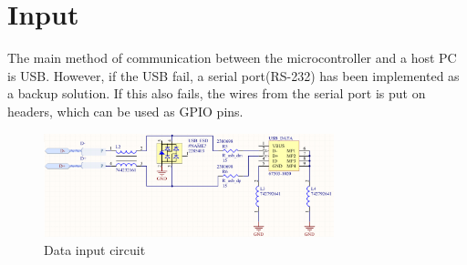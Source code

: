 \documentclass[../main/report.tex]{subfiles}
\begin{document}
\section{Input}

The main method of communication between the microcontroller and a host PC is USB.
However, if the USB fail, a serial port(RS-232) has been implemented as a backup solution.
If this also fails, the wires from the serial port is put on headers, which can be used as GPIO pins.

\begin{figure}[H]
		\centering
		\includegraphics[width=0.75\textwidth]{../pcb/assets/input.png}
		\caption{Data input circuit}
		\label{fig: input circuit}
\end{figure}
\end{document}

